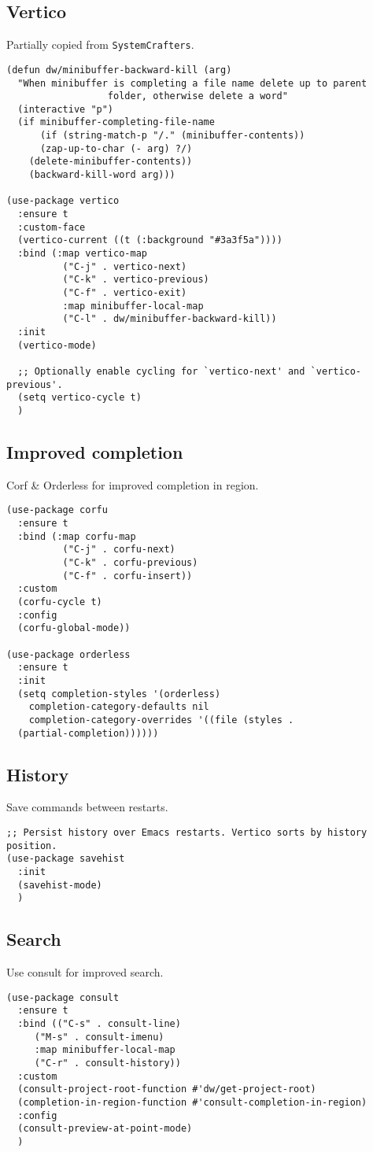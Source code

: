 \documentclass[11pt]{article}
\begin{document}
\subsection{Vertico}
\label{sec:org7a2ef43}
Partially copied from \texttt{SystemCrafters}.
\begin{verbatim}
(defun dw/minibuffer-backward-kill (arg)
  "When minibuffer is completing a file name delete up to parent
			      folder, otherwise delete a word"
  (interactive "p")
  (if minibuffer-completing-file-name
      (if (string-match-p "/." (minibuffer-contents))
	  (zap-up-to-char (- arg) ?/)
	(delete-minibuffer-contents))
    (backward-kill-word arg)))

(use-package vertico
  :ensure t
  :custom-face
  (vertico-current ((t (:background "#3a3f5a"))))
  :bind (:map vertico-map
	      ("C-j" . vertico-next)
	      ("C-k" . vertico-previous)
	      ("C-f" . vertico-exit)
	      :map minibuffer-local-map
	      ("C-l" . dw/minibuffer-backward-kill))
  :init
  (vertico-mode)

  ;; Optionally enable cycling for `vertico-next' and `vertico-previous'.
  (setq vertico-cycle t)
  )
\end{verbatim}
\subsection{Improved completion}
\label{sec:org9348335}
Corf \& Orderless for improved completion in region.
\begin{verbatim}
(use-package corfu
  :ensure t
  :bind (:map corfu-map
	      ("C-j" . corfu-next)
	      ("C-k" . corfu-previous)
	      ("C-f" . corfu-insert))
  :custom
  (corfu-cycle t)
  :config
  (corfu-global-mode))

(use-package orderless
  :ensure t
  :init
  (setq completion-styles '(orderless)
	completion-category-defaults nil
	completion-category-overrides '((file (styles .
  (partial-completion))))))
\end{verbatim}

\subsection{History}
\label{sec:orgcad3b22}
Save commands between restarts.
\begin{verbatim}
;; Persist history over Emacs restarts. Vertico sorts by history position.
(use-package savehist
  :init
  (savehist-mode)
  )
\end{verbatim}
\subsection{Search}
\label{sec:org42b1a3a}
Use consult for improved search.
\begin{verbatim}
(use-package consult
  :ensure t
  :bind (("C-s" . consult-line)
	 ("M-s" . consult-imenu)
	 :map minibuffer-local-map
	 ("C-r" . consult-history))
  :custom
  (consult-project-root-function #'dw/get-project-root)
  (completion-in-region-function #'consult-completion-in-region)
  :config
  (consult-preview-at-point-mode)
  )
\end{verbatim}
\end{document}
